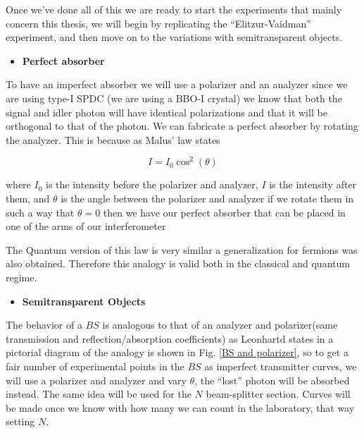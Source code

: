 \documentclass{book}
\begin{document}
Once we've done all of this we are ready to start the experiments that mainly concern this thesis, we will begin by replicating the ``Elitzur-Vaidman'' experiment, and then move on to the variations with semitransparent objects.


\begin{itemize}
\item {\large \textbf{Perfect absorber}}
\end{itemize}
To have an imperfect absorber we will use a polarizer and an analyzer since we are using type-I SPDC (we are using a BBO-I crystal) we know that both the signal and idler photon will have identical polarizations and that it will be orthogonal to that of the photon. We can fabricate a perfect absorber by rotating the analyzer. This is because as Malus' law states \cite{hecht}

\begin{equation}
I=I_{0} \cos^{2}(\theta)
\end{equation}

where $I_{0}$ is the intensity before the polarizer and analyzer, $I$ is the intensity after them, and $\theta$ is the angle between the polarizer and analyzer if we rotate them in such a way that $\theta=0$ then we have our perfect absorber that can be placed in one of the arms of our interferometer


The Quantum version of this law is very similar \cite{malus} a generalization for fermions was also obtained. Therefore this analogy is valid both in the classical and quantum regime.
 \begin{itemize}
\item {\large \textbf{Semitransparent Objects}}
\end{itemize}

The behavior of a $BS$ is analogous to that of an analyzer and polarizer(same transmission and reflection/absorption coefficients) as Leonhartd states in \cite{Leonhardt_2003} a pictorial diagram of the analogy is shown in Fig. \ref{BS and polarizer}, so to get a fair number of experimental points in the $BS$ as imperfect transmitter curves, we will use a polarizer and analyzer and vary $\theta$, the ``lost'' photon will be absorbed instead. The same idea will be used for the $N$ beam-splitter section. Curves will be made once we know with how many we can count in the laboratory, that way setting $N$.
\end{document}
